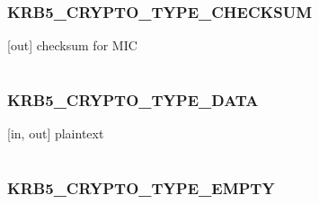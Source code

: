 \documentclass[letterpaper,10pt,english]{sphinxmanual}
\begin{document}
\subsubsection{KRB5\_CRYPTO\_TYPE\_CHECKSUM}
\label{appdev/refs/macros/KRB5_CRYPTO_TYPE_CHECKSUM:krb5-crypto-type-checksum-data}\label{appdev/refs/macros/KRB5_CRYPTO_TYPE_CHECKSUM:krb5-crypto-type-checksum}\label{appdev/refs/macros/KRB5_CRYPTO_TYPE_CHECKSUM::doc}

\begin{fulllineitems}
\label{appdev/refs/macros/KRB5_CRYPTO_TYPE_CHECKSUM:KRB5_CRYPTO_TYPE_CHECKSUM}
\end{fulllineitems}


{[}out{]} checksum for MIC

\begin{tabulary}{\linewidth}{|L|L|}
\hline

 & 
\\\hline
\end{tabulary}



\subsubsection{KRB5\_CRYPTO\_TYPE\_DATA}
\label{appdev/refs/macros/KRB5_CRYPTO_TYPE_DATA::doc}\label{appdev/refs/macros/KRB5_CRYPTO_TYPE_DATA:krb5-crypto-type-data}\label{appdev/refs/macros/KRB5_CRYPTO_TYPE_DATA:krb5-crypto-type-data-data}

\begin{fulllineitems}
\label{appdev/refs/macros/KRB5_CRYPTO_TYPE_DATA:KRB5_CRYPTO_TYPE_DATA}
\end{fulllineitems}


{[}in, out{]} plaintext

\begin{tabulary}{\linewidth}{|L|L|}
\hline

 & 
\\\hline
\end{tabulary}



\subsubsection{KRB5\_CRYPTO\_TYPE\_EMPTY}
\label{appdev/refs/macros/KRB5_CRYPTO_TYPE_EMPTY::doc}\label{appdev/refs/macros/KRB5_CRYPTO_TYPE_EMPTY:krb5-crypto-type-empty}\label{appdev/refs/macros/KRB5_CRYPTO_TYPE_EMPTY:krb5-crypto-type-empty-data}
\end{document}
